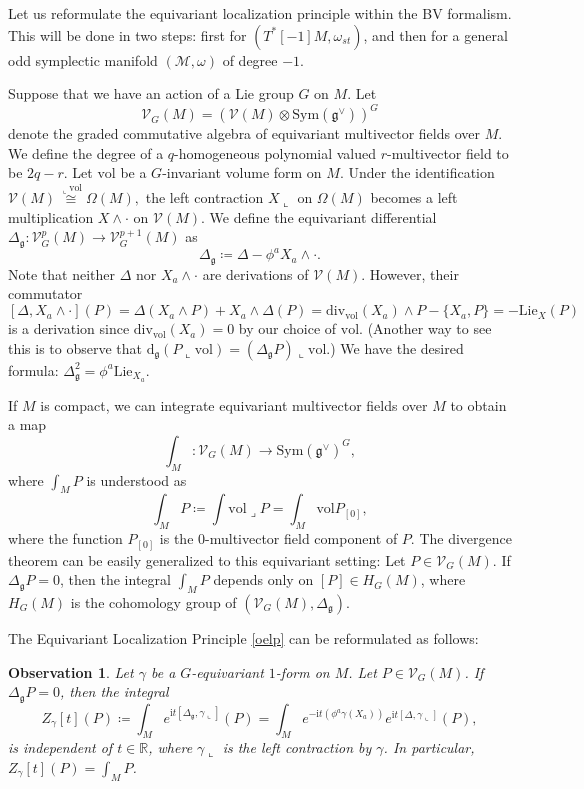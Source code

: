 \documentclass[12pt]{amsart}
\numberwithin{table}{section}
\numberwithin{equation}{section}
\newtheorem{obs}{Observation}[section]
\theoremstyle{plain}
\newcommand{\R}{\mathbb{R}}
\newcommand{\dg}{\mathrm{d}_{\mathfrak{g}}}
\newcommand{\vol}{\mathrm{vol}}
\newcommand{\dive}{\mathrm{div}}
\newcommand{\Sym}{\mathrm{Sym}}
\newcommand{\MV}{\mathcal{V}}
\begin{document}
\vspace{10pt}
Let us reformulate the equivariant localization principle within the BV formalism. This will be done in two steps: first for $(T^*[-1]M, \omega_{st})$, and then for a general odd symplectic manifold $(\mathcal{M}, \omega)$ of degree $-1$.

Suppose that we have an action of a Lie group $G$ on $M$. Let
\[
\MV_{G}(M) = (\MV(M) \otimes \Sym (\mathfrak{g}^{\vee}))^{G}
\]
denote the graded commutative algebra of equivariant multivector fields over $M$. We define the degree of a $q$-homogeneous polynomial valued $r$-multivector field to be $2q - r$. Let $\vol$ be a $G$-invariant volume form on $M$. Under the identification 
$
\MV(M) \overset{\llcorner \vol}{\cong} \Omega(M),
$
the left contraction $X \llcorner$ on $\Omega(M)$ becomes a left multiplication 
$
X \wedge \cdot
$
on $\MV(M)$.
We define the equivariant differential $\Delta_{\mathfrak{g}}\colon \MV^p_{G}(M) \rightarrow \MV^{p+1}_{G}(M)$ as
\[
\Delta_{\mathfrak{g}}\coloneqq \Delta - \phi^a X_a \wedge \cdot.
\]
Note that neither $\Delta$ nor $X_a \wedge \cdot$ are derivations of $\MV(M)$. However, their commutator
\[
[\Delta, X_a \wedge \cdot](P) = \Delta(X_a \wedge P) + X_a \wedge \Delta(P)= \dive_{\vol}(X_a) \wedge P - \{X_a, P\} = - \mathrm{Lie}_X(P)
\] 
is a derivation since $\dive_{\vol}(X_a)=0$ by our choice of $\vol$. 
(Another way to see this is to observe that $\dg(P \llcorner \vol) = (\Delta_{\mathfrak{g}} P) \llcorner \vol$.)
We have the desired formula:
$
\Delta_{\mathfrak{g}}^2 = \phi^a \mathrm{Lie}_{X_a}.
$

If $M$ is compact, we can integrate equivariant multivector fields over $M$ to obtain a map
\[
\int_M\colon \MV_G(M) \rightarrow \Sym(\mathfrak{g}^{\vee})^G,
\]
where $\int_M P$ is understood as
\[
\int_M P\coloneqq\int \vol \lrcorner P = \int_M \vol P_{[0]},
\]
where the function $P_{[0]}$ is the $0$-multivector field component of $P$. The divergence theorem can be easily generalized to this equivariant setting: Let $P \in \MV_G(M)$. If $\Delta_{\mathfrak{g}} P = 0$, then the integral
$
\int_M P
$
depends only on $[P] \in H_{G}(M)$, where $H_G(M)$ is the cohomology group of $(\MV_G(M), \Delta_{\mathfrak{g}})$.

The Equivariant Localization Principle \ref{oelp} can be reformulated as follows:
\begin{obs}\label{obvelp}
	Let $\gamma$ be a $G$-equivariant $1$-form on $M$.  Let $P \in \MV_G(M)$. If $\Delta_{\mathfrak{g}} P = 0$, then the integral
	\begin{equation}\label{bvelp}
		Z_{\gamma}[t](P)\coloneqq\int_M e^{\mathrm{i}t[\Delta_{\mathfrak{g}}, \gamma \llcorner]}(P) = \int_M e^{-\mathrm{i}t(\phi^a \gamma(X_a))}e^{\mathrm{i}t[\Delta, \gamma \llcorner]}(P),
	\end{equation}
	is independent of $t \in \R$, where $\gamma \llcorner$ is the left contraction by $\gamma$. In particular, $Z_{\gamma}[t](P) = \int_M P$.
\end{obs}
\end{document}
